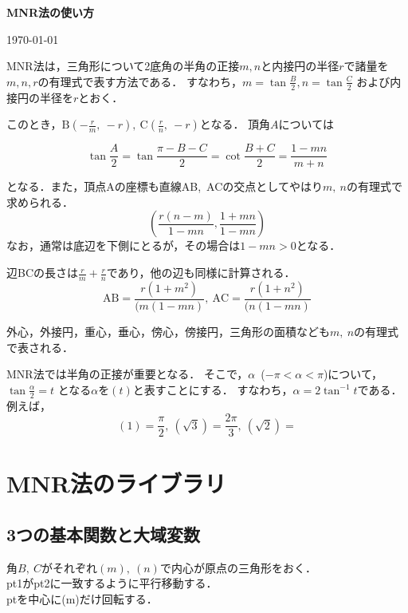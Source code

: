\documentclass[a4j,12pt]{jarticle}
\begin{document}
\begin{center}
{\bf \large MNR法の使い方}
\end{center}
\hfill \today

MNR法は，三角形について2底角の半角の正接$m,n$と内接円の半径$r$で諸量を$m,n,r$の有理式で表す方法である．%
すなわち，$m=\tan\frac{B}{2},n=\tan\frac{C}{2}$%
および内接円の半径を$r$とおく．

\begin{center}

\end{center}

このとき，$\mathrm{B}(-\frac{r}{m},\ -r),\ \mathrm{C}(\frac{r}{n},\ -r)$となる．
頂角$A$については

$$\tan\frac{A}{2}=\tan\frac{\pi-B-C}{2}=\cot\frac{B+C}{2}=\dfrac{1-mn}{m+n}$$

\noindent
となる．また，頂点Aの座標も直線AB,\ ACの交点としてやはり$m,\ n$の有理式で求められる．
$$\left(\frac{r(n-m)}{1-mn},\frac{1+mn}{1-mn}\right)$$
なお，通常は底辺を下側にとるが，その場合は$1-mn>0$となる．\vspace{1mm}

辺BCの長さは$\frac{r}{m}+\frac{r}{n}$\vspace{1mm}であり，他の辺も同様に計算される．
 $$\mathrm{AB}=\frac{r(1 + m^2)}{(m(1 - mn)},\ \mathrm{AC}=\frac{r(1 + n^2)}{(n(1 - mn)}$$

\noindent
外心，外接円，重心，垂心，傍心，傍接円，三角形の面積なども$m,\ n$の有理式で表される．

MNR法では半角の正接が重要となる．
そこで，$\alpha$\ ($-\pi<\alpha<\pi$)について，
$\tan\frac{\alpha}{2}=t$
となる$\alpha$を$(t)$と表すことにする．
すなわち，$\alpha=2\tan^{-1}t$である．
例えば，
$$(1)=\dfrac{\pi}{2},\ (\sqrt{3})=\dfrac{2\pi}{3},\ (\sqrt{2})=$$

\section{MNR法のライブラリ}

\subsection{3つの基本関数と大域変数}

\noindent
\hspace*{2zw}角$B,\ C$がそれぞれ$(m),\ (n)$で内心が原点の三角形をおく．\\
\hspace*{2zw}pt1がpt2に一致するように平行移動する．\\
\hspace*{2zw}ptを中心に(m)だけ回転する．\vspace{2mm}
\end{document}

